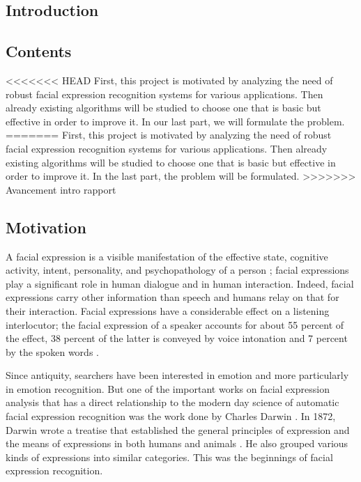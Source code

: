  \begin{titlepage}
    \vspace*{\fill}
      \part{Introduction}
    \vspace*{\fill}
  \end{titlepage}

\chapter*{Contents}
<<<<<<< HEAD
First, this project is motivated by analyzing the need of robust facial expression recognition systems for various applications. Then already existing algorithms will be studied to choose one that is basic but effective in order to improve it. In our last part, we will formulate the problem.
\newpage
=======
First, this project is motivated by analyzing the need of robust facial expression recognition systems for various applications. Then already existing algorithms will be studied to choose one that is basic but effective in order to improve it. In the last part, the problem will be formulated.
>>>>>>> Avancement intro rapport

\chapter{Motivation}

A facial expression is a visible manifestation of the effective state, cognitive activity, intent, personality, and psychopathology of a person \cite{DON99}; facial expressions play a significant role in human dialogue and in human interaction. Indeed, facial expressions carry other information than speech and humans relay on that for their interaction. Facial expressions have a considerable effect on a listening interlocutor; the facial expression of a speaker accounts for about 55 percent of the effect, 38 percent of the latter is conveyed by voice intonation and 7 percent by the spoken words \cite{PAN00}.
\newline

\noindent Since antiquity, searchers have been interested in emotion and more particularly in emotion recognition. But one of the important works on facial expression analysis that has a direct relationship to the modern day science of automatic facial expression recognition was the work done by Charles Darwin \cite{BET12}. In 1872, Darwin wrote a treatise that established the general principles of expression and the means of expressions in both humans and animals \cite{DAR04}. He also grouped various kinds of expressions into similar categories. This was the beginnings of facial expression recognition.
\newline

